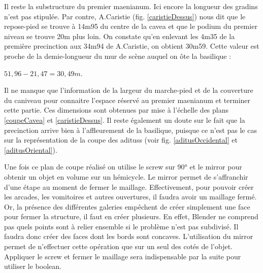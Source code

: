 Il reste la substructure du premier \gls{maenianum}. Ici encore la longueur des gradins n'est pas stipulée. Par contre, A.Caristie (fig. \ref{caristieDessus}) nous dit que le repose-pied se trouve à 14m95 du centre de la \gls{cavea} et que le \gls{podium} du premier niveau se trouve 20m plus loin. On constate qu'en enlevant les 4m35 de la première \gls{precinction} aux 34m94 de A.Caristie, on obtient 30m59. Cette valeur est proche de la demie-longueur du mur de scène auquel on ôte la basilique : 
\begin{center}
$51,96 - 21,47=30,49m$.
\end{center}

Il ne manque que l'information de la largeur du marche-pied et de la couverture du caniveau pour connaitre l'espace réservé au premier \gls{maenianum} et terminer cette partie. Ces dimensions sont obtenues par mise à l'échelle des plans \ref{coupeCavea} et \ref{caristieDessus}. Il reste également un doute sur le fait que la \gls{precinction} arrive bien à l'affleurement de la basilique, puisque ce n'est pas le cas sur la représentation de la coupe des \glspl{aditus} (voir fig. \ref{aditusOccidental} et \ref{aditusOriental}).

Une fois ce plan de coupe réalisé on utilise le \gls{screw} sur 90° et le \gls{mirror} pour obtenir un objet en volume sur un hémicycle. Le \gls{mirror} permet de s'affranchir d'une étape au moment de fermer le maillage. Effectivement, pour pouvoir créer les arcades, les vomitoires et autres ouvertures, il faudra avoir un maillage fermé. Or, la présence des différentes galeries empêchent de créer simplement une face pour fermer la structure, il faut en créer plusieurs. En effet, Blender ne comprend pas quels points sont à relier ensemble si le problème n'est pas subdivisé. Il faudra donc créer des faces dont les bords sont concaves. L'utilisation du \gls{mirror} permet de n'effectuer cette opération que sur un seul des cotés de l'objet. Appliquer le \gls{screw} et fermer le maillage sera indispensable par la suite pour utiliser le \gls{boolean}.

